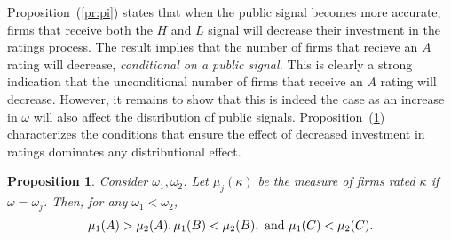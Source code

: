 \documentclass[notitlepage]{article}
\newtheorem{proposition}{Proposition}
\begin{document}
Proposition~(\ref{pr:pi}) states that when the public signal becomes more accurate, firms that receive both the $H$ and $L$ signal will decrease their investment in the ratings process.  The result implies that the number of firms that recieve an $A$ rating will decrease, \emph{conditional on a public signal.} This is clearly a strong indication that the unconditional number of firms that receive an $A$ rating will decrease. However, it remains to show that this is indeed the case as an increase in $\omega$ will also affect the distribution of public signals. Proposition~(\ref{pr:dist}) characterizes the conditions that ensure the effect of decreased investment in ratings dominates any distributional effect.

\begin{proposition}
\label{pr:dist}
Consider $\omega_{1},\omega_{2}$. Let $\mu_{j}(\kappa)$ be the measure of firms rated $\kappa$ if $\omega=\omega_{j}$. Then, for any $\omega_{1}<\omega_{2}$,
\begin{equation*}
\mu_{1}(A)>\mu_{2}(A), \mu_{1}(B)<\mu_{2}(B), \textup{ and } \mu_{1}(C)<\mu_{2}(C).
\end{equation*}
\end{proposition}
\end{document}
